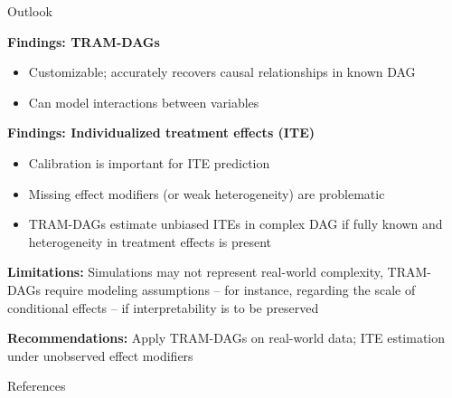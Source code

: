 \documentclass[onlytextwidth,english]{beamer}\usepackage[]{graphicx}\usepackage[]{xcolor}
\begin{document}
\begin{frame}{Outlook}


\textbf{Findings: TRAM-DAGs}

\begin{itemize}
\item Customizable; accurately recovers causal relationships in known DAG
\item Can model interactions between variables
\end{itemize}

\textbf{Findings: Individualized treatment effects (ITE)}

\begin{itemize}
\item Calibration is important for ITE prediction
\item Missing effect modifiers (or weak heterogeneity) are problematic
\item TRAM-DAGs estimate unbiased ITEs in complex DAG if fully known and heterogeneity in treatment effects is present
\end{itemize}

\textbf{Limitations:} Simulations may not represent real-world complexity, TRAM-DAGs require modeling assumptions -- for instance, regarding the scale of conditional effects -- if interpretability is to be preserved


\textbf{Recommendations:} Apply TRAM-DAGs on real-world data; ITE estimation under unobserved effect modifiers

\end{frame}


% 
% 
% 
% 
% 
% 
% 
% 
% 
% 
% 
% 
% 
% 
% 
% 



\begin{frame}{References}
  \small
  

\end{frame}
\end{document}
